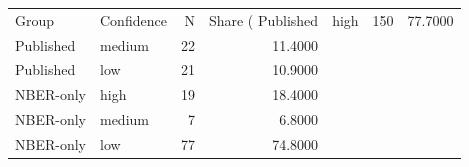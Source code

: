 \begin{tabular}{llrr}
\toprule
Group & Confidence & N & Share (%
\midrule
Published & high & 150 & 77.7000 \\
Published & medium & 22 & 11.4000 \\
Published & low & 21 & 10.9000 \\
NBER-only & high & 19 & 18.4000 \\
NBER-only & medium & 7 & 6.8000 \\
NBER-only & low & 77 & 74.8000 \\
\bottomrule
\end{tabular}

